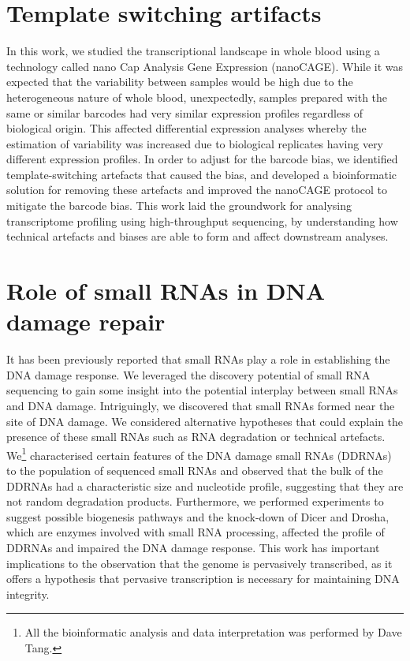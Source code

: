 \documentclass[10pt,a4paper]{report}
\begin{document}
\chapter{Template switching artifacts}\label{template_switching}


In this work, we studied the transcriptional landscape in whole blood using a technology called nano Cap Analysis Gene Expression (nanoCAGE). While it was expected that the variability between samples would be high due to the heterogeneous nature of whole blood, unexpectedly, samples prepared with the same or similar barcodes had very similar expression profiles regardless of biological origin. This affected differential expression analyses whereby the estimation of variability was increased due to biological replicates having very different expression profiles. In order to adjust for the barcode bias, we identified template-switching artefacts that caused the bias, and developed a bioinformatic solution for removing these artefacts and improved the nanoCAGE protocol to mitigate the barcode bias. This work laid the groundwork for analysing transcriptome profiling using high-throughput sequencing, by understanding how technical artefacts and biases are able to form and affect downstream analyses.



\chapter{Role of small RNAs in DNA damage repair}\label{ddrna}


It has been previously reported that small RNAs play a role in establishing the DNA damage response\cite{pmid19444217}. We leveraged the discovery potential of small RNA sequencing to gain some insight into the potential interplay between small RNAs and DNA damage. Intriguingly, we discovered that small RNAs formed near the site of DNA damage. We considered alternative hypotheses that could explain the presence of these small RNAs such as RNA degradation or technical artefacts. We\footnote{All the bioinformatic analysis and data interpretation was performed by Dave Tang.} characterised certain features of the DNA damage small RNAs (DDRNAs) to the population of sequenced small RNAs and observed that the bulk of the DDRNAs had a characteristic size and nucleotide profile, suggesting that they are not random degradation products. Furthermore, we performed experiments to suggest possible biogenesis pathways and the knock-down of Dicer and Drosha, which are enzymes involved with small RNA processing, affected the profile of DDRNAs and impaired the DNA damage response. This work has important implications to the observation that the genome is pervasively transcribed, as it offers a hypothesis that pervasive transcription is necessary for maintaining DNA integrity.
\end{document}
